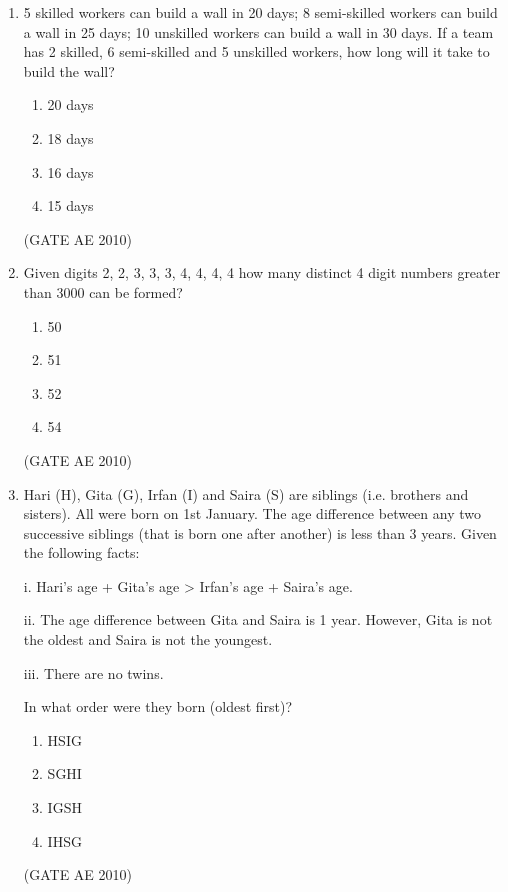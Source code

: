 \documentclass[journal]{IEEEtran}
\begin{document}
\begin{enumerate}
\item 5 skilled workers can build a wall in 20 days; 8 semi-skilled workers can build a wall in 25 days; 10 unskilled workers can build a wall in 30 days. If a team has 2 skilled, 6 semi-skilled and 5 unskilled workers, how long will it take to build the wall?
\begin{multicols}{4}
\begin{enumerate}
\item 20 days
\item 18 days
\item 16 days
\item 15 days
\end{enumerate}
\end{multicols}
\hfill (GATE AE 2010)

\item Given digits 2, 2, 3, 3, 3, 4, 4, 4, 4 how many distinct 4 digit numbers greater than 3000 can be formed?
\begin{multicols}{4}
\begin{enumerate}
\item 50
\item 51
\item 52
\item 54
\end{enumerate}
\end{multicols}
\hfill (GATE AE 2010)

\item Hari (H), Gita (G), Irfan (I) and Saira (S) are siblings (i.e. brothers and sisters). All were born on 1st January. The age difference between any two successive siblings (that is born one after another) is less than 3 years. Given the following facts: 

    i. Hari's age + Gita's age > Irfan's age + Saira's age. 
    
    ii. The age difference between Gita and Saira is 1 year. However, Gita is not the oldest and Saira is not the youngest. 
    
    iii. There are no twins. 
    
    In what order were they born (oldest first)?
\begin{multicols}{4}
\begin{enumerate}
\item HSIG
\item SGHI
\item IGSH
\item IHSG
\end{enumerate}
\end{multicols}
\hfill (GATE AE 2010)

\end{enumerate}
\end{document}
